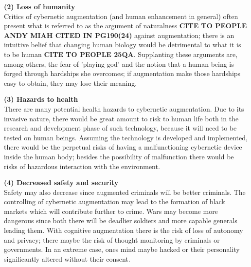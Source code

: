 \textbf{(2) Loss of humanity} \\
Critics of cybernetic augmentation (and human enhancement in general) often present what is referred to as the argument of naturalness {\bf CITE TO PEOPLE ANDY MIAH CITED IN PG190(24)} against augmentation; there is an intuitive belief that changing human biology would be detrimental to what it is to be human {\bf CITE TO PEOPLE 25QA}. Supplanting these arguments are, among others, the fear of 'playing god' and the notion that a human being is forged through hardships she overcomes; if augmentation make those hardships easy to obtain, they may lose their meaning.


\textbf{(3) Hazards to health} \\
There are many potential health hazards to cybernetic augmentation. Due to its invasive nature, there would be great amount to risk to human life both in the research and development phase of such technology, because it will need to be tested on human beings. Assuming the technology is developed and implemented, there would be the perpetual risks of having a malfunctioning cybernetic device inside the human body; besides the possibility of malfunction there would be risks of hazardous interaction with the environment.


\textbf{(4) Decreased safety and security} \\
Safety may also decrease since augmented criminals will be better criminals. The controlling of cybernetic augmentation may lead to the formation of black markets which will contribute further to crime. Wars may become more dangerous since both there will be deadlier soldiers and more capable generals leading them. With cognitive augmentation there is the risk of loss of autonomy and privacy; there maybe the risk of thought monitoring by criminals or governments. In an extreme case, ones mind maybe hacked or their personality significantly altered without their consent.


